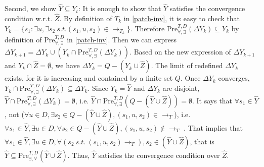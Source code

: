 Second, we show $ \widehat{Y}\subseteq Y_t $: It is enough to show that $ \widehat{Y} $ satisfies the convergence condition w.r.t. $ \widehat{Z} $. By definition of $ T_k $ in \eqref{patch-inv}, it is easy to check that $ Y_k = \{s_1: \exists u, \exists s_2\ s.t. (s_1,u,s_2)\in \rightarrow_{T_k}\} $. Therefore $ \text{Pre}_{\forall,\exists}^{T, D}(\Delta Y_k)\subseteq  Y_k$ by definition of $ \text{Pre}^{T,D}_{\forall,\exists} $ in \eqref{patch-inv}. Then we can express $ \Delta Y_{k+1}= \Delta Y_k \cup (Y_k \cap \text{Pre}_{\forall,\exists}^{T, D}(\Delta Y_k)) $. Based on the new expression of $ \Delta Y_{k+1}$ and $ Y_k \cap \widehat{Z} = \emptyset $, we have $ \Delta Y_k = Q-(Y_k\cup \widehat{Z}) $. The limit of redefined $ \Delta Y_k $ exists, for it is increasing and contained by a finite set $ Q $. Once $ \Delta Y_k $ converges, $ Y_k \cap \text{Pre}_{\forall,\exists}^{T, D}(\Delta Y_k)\subseteq \Delta Y_k $. Since $ Y_k=\widehat{Y} $ and $ \Delta Y_k $ are disjoint, $ \widehat{Y} \cap \text{Pre}_{\forall,\exists}^{T, D}(\Delta Y_k) = \emptyset $, i.e.  $ \widehat{Y} \cap \text{Pre}_{\forall,\exists}^{T, D}(Q-(\widehat{Y}\cup \widehat{Z})) = \emptyset $. It says that $ \forall s_1 \in \widehat{Y}$, not ($\forall u\in D, \exists s_2\in Q-(\widehat{Y}\cup \widehat{Z}), (s_1,u,s_2)\in \rightarrow_{T} $), i.e. $ \forall s_1 \in \widehat{Y}, \exists u\in D, \forall s_2 \in Q-(\widehat{Y}\cup \widehat{Z}),  (s_1,u,s_2)\not\in \rightarrow_{T}$ . That implies that $ \forall s_1\in \widehat{Y}, \exists u\in D, \forall (s_2\ s.t.\ (s_1,u,s_2)\rightarrow_T), s_2\in (\widehat{Y}\cup \widehat{Z}) $, that is $ \widehat{Y}\subseteq \text{Pre}_{\exists,\forall}^{T,D}(\widehat{Y}\cup \widehat{Z}) $. Thus, $ \widehat{Y} $ satisfies the convergence condition over $ \widehat{Z} $. \QEDB
